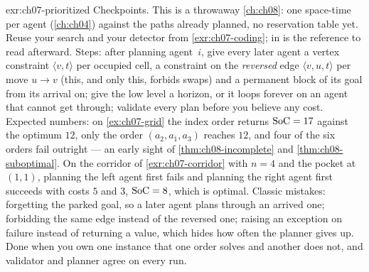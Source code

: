 \begin{solution}{exr:ch07-prioritized}
Checkpoints. This is a throwaway \cref{ch:ch08}: one space-time \astar per agent
(\cref{ch:ch04}) against the paths already planned, no reservation table yet. Reuse your
search and your detector from \cref{exr:ch07-coding};  in
 is the reference to read afterward. Steps: after planning
agent~$i$, give every later agent a vertex constraint $\langle v,t\rangle$ per occupied
cell, a constraint on the \emph{reversed} edge $\langle v,u,t\rangle$ per move $u\to v$
(this, and only this, forbids swaps) and a permanent block of its goal from its arrival
on; give the low level a horizon, or it loops forever on an agent that cannot get through;
validate every plan before you believe any cost. Expected numbers: on \cref{ex:ch07-grid}
the index order returns $\mathrm{SoC}=17$ against the optimum $12$, only the order
$(a_2,a_1,a_3)$ reaches $12$, and four of the six orders fail outright --- an early sight
of \cref{thm:ch08-incomplete} and \cref{thm:ch08-suboptimal}. On the corridor of
\cref{exr:ch07-corridor} with $n=4$ and the pocket at $(1,1)$, planning the left agent
first fails and planning the right agent first succeeds with costs $5$ and $3$,
$\mathrm{SoC}=8$, which is optimal. Classic mistakes: forgetting the parked goal, so a later
agent plans through an arrived one; forbidding the same edge instead of the reversed one;
raising an exception on failure instead of returning a value, which hides how often the
planner gives up. Done when you own one instance that one order solves and another does
not, and validator and planner agree on every run.
\end{solution}

